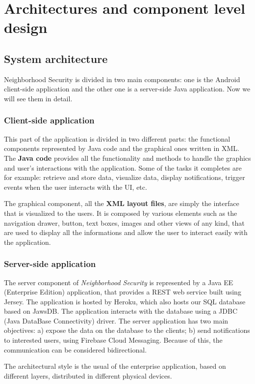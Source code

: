 \documentclass[a4paper]{scrreprt}
\begin{document}
\chapter{Architectures and component level design}

\section{System architecture}
Neighborhood Security is divided in two main components: one is the Android client-side application and the other one is a server-side Java application. Now we will see them in detail.

\subsection{Client-side application}
This part of the application is divided in two different parts: the functional components represented by Java code and the graphical ones written in XML. The \textbf{Java code} provides all the functionality and methods to handle the graphics and user's interactions with the application. Some of the tasks it completes are for example: retrieve and store data, visualize data, display notifications, trigger events when the user interacts with the UI, etc.

The graphical component, all the \textbf{XML layout files}, are simply the interface that is visualized to the users. It is composed by various elements such as the navigation drawer, button, text boxes, images and other views of any kind, that are used to display all the informations and allow the user to interact easily with the application.

\subsection{Server-side application}
The server component of \emph{Neighborhood Security} is represented by a Java EE (Enterprise Edition) application, that provides a REST web service built using Jersey. The application is hosted by Heroku, which also hosts our SQL database based on JawsDB. The application interacts with the database using a JDBC (Java DataBase Connectivity) driver. The server application has two main objectives: a) expose the data on the database to the clients; b) send notifications to interested users, using Firebase Cloud Messaging. Because of this, the communication can be considered bidirectional.

\bigskip The architectural style is the usual of the enterprise application, based on different layers, distributed in different physical devices.
\end{document}

